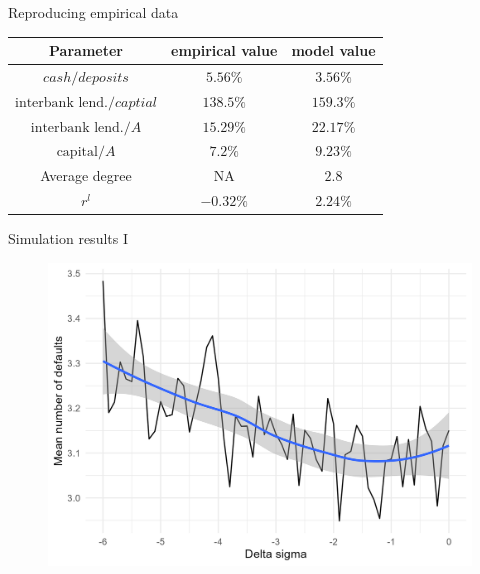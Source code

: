 \documentclass{beamer}
\begin{document}
\begin{frame}{Reproducing empirical data}

 
\begin{table}
    \begin{center}
        \begin{tabular}{|c | c | c|} 
         \hline
         Parameter & empirical value  & model value\\ [0.3ex] 
         \hline\hline
         $cash / deposits$ & $5.56\%$ &  $3.56\%$ \\ 
         \hline
         $\text{interbank lend.} / captial$ & $138.5\%$ &  $159.3\%$ \\
         \hline
         $\text{interbank lend.} / A$ & $15.29\%$ &  $22.17\%$ \\
         \hline
         $\text{capital} / A$ & $7.2\%$ &  $9.23\%$ \\
         \hline
         Average degree & NA & $2.8$ \\
         \hline
         $r^l$ & $-0.32\%$ & $2.24\%$ \\  [1ex] 
         \hline
        \end{tabular}
    \end{center}
\end{table}
    
\end{frame}

\begin{frame}{Simulation results I}
    
\begin{figure}[H]
    \includegraphics[scale=0.6]{delta_sigma.png}
    \centering
\end{figure}  
  
\end{frame}
\end{document}
